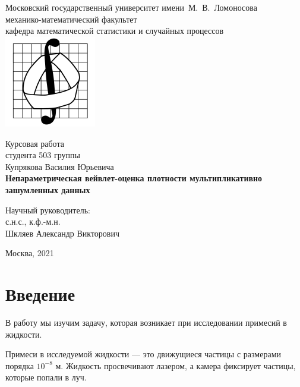\documentclass[12pt, a4paper]{report}
\begin{document}
%
\thispagestyle{empty}
\sloppy
\begin{titlepage}
\begin{center}
Московский государственный университет имени~М.~В.~Ломоносова\\
механико-математический факультет\\
кафедра математической статистики и случайных процессов\\

\centering
\includegraphics[width=0.3\textwidth]{mechmath.jpg}

\vspace*{100pt} Курсовая работа\\студента 503 группы \\
Купрякова Василия Юрьевича
\\
\vspace{10pt} {\Large{\textbf{Непараметрическая вейвлет-оценка плотности мультипликативно зашумленных данных}}\\}

\vspace*{40pt}

\begin{flushright}
Научный руководитель:\\ с.н.с., к.ф.-м.н.\\  Шкляев Александр Викторович\\
\end{flushright}

\vspace*{\fill} Москва, 2021
\end{center}
\end{titlepage}
\clearpage
%
\tableofcontents
%
\chapter{Введение}
В работу мы изучим задачу, которая возникает при исследовании примесий в жидкости.

Примеси в исследуемой жидкости --- это движущиеся частицы с размерами порядка $10^{-8}$ м.
Жидкость просвечивают лазером, а камера фиксирует частицы, которые попали в луч.
\end{document}
